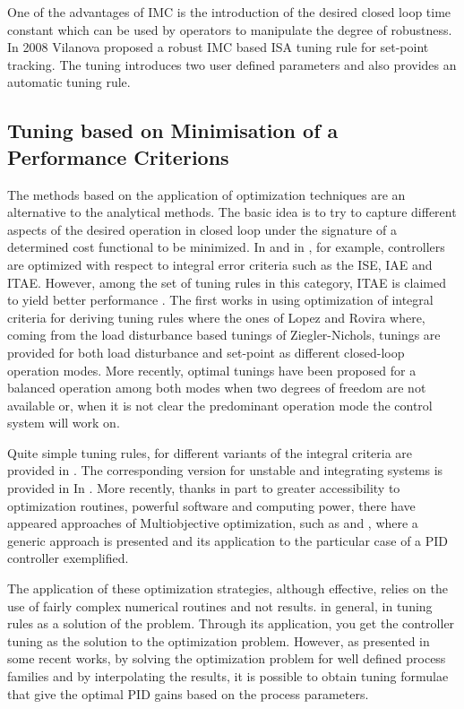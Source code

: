 One of the advantages of IMC is the introduction of the desired closed loop time constant which can be used by operators to manipulate the degree of robustness. In 2008 Vilanova \cite{vilanovaJPC2008}  proposed a robust IMC based ISA tuning rule for set-point tracking. The tuning introduces two user defined parameters and also provides an automatic tuning rule.


\subsection{Tuning based on Minimisation of a Performance Criterions}

The methods based on the application of optimization techniques are an alternative to the analytical methods.
The basic idea is to try to capture different aspects of the desired operation in closed loop under the signature of a determined cost functional to be minimized. In \cite{corripio2001} and in \cite{shinskey.1994}, for example, controllers are  optimized with respect to integral error criteria such as the  ISE, IAE and ITAE.  However, among the
set of tuning rules in this category, ITAE is claimed to yield better performance \cite{ogatabook}. The first works in using optimization of integral criteria for deriving tuning rules where the ones of Lopez \cite{lopez1967} and Rovira \cite{Rovira1969a}   where, coming from the load disturbance based tunings of Ziegler-Nichols, tunings are provided for both load disturbance and set-point as different closed-loop operation modes. More recently, optimal tunings have been proposed \cite{arrieta2010} for a balanced operation among both modes when two degrees of freedom are not available or, when it is not clear the predominant operation mode the control system will work on.

Quite simple tuning rules, for different variants of the integral criteria are provided in \cite{zhuang1993} . The corresponding version for unstable and integrating systems is provided in In \cite{visioli2001}. More recently, thanks in part to greater accessibility to optimization routines, powerful software and computing power, there have appeared approaches of Multiobjective optimization, such as \cite{herreros2002}  and \cite{toivonen2006}, where a generic approach is presented and its application to the particular case of a PID controller exemplified. 

The application of these optimization strategies, although effective, relies on the use of fairly complex numerical routines and not results. in general, in tuning rules as a solution of the problem. Through its application, you get the controller tuning as the solution to the optimization problem. However, as presented in some recent works, by solving the optimization problem for well defined process families and by interpolating the results, it is possible to obtain tuning formulae that give the optimal PID gains based on the process parameters. 


